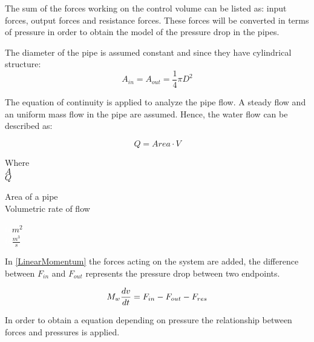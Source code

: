 The sum of the forces working on the control volume can be listed as: input forces, output forces and resistance forces.  
These forces will be converted in terms of pressure in order to obtain the model of the pressure drop in the pipes. 

The diameter of the pipe is assumed constant and since they have cylindrical structure:
\begin{equation}
  A_{in} = A_{out} = \frac{1}{4}\pi D^{2}
\end{equation}

The equation of continuity is applied to analyze the pipe flow. A steady flow and an uniform 
mass flow in the pipe are assumed. Hence, the water flow can be described as: 

\begin{equation}
  Q=Area \cdot V
	\label{EquationOfContinuity}
\end{equation}

 \begin{minipage}[t]{0.20\textwidth}
Where\\
\hspace*{8mm} $A$ \\
\hspace*{8mm} $Q$ 
\end{minipage}
\begin{minipage}[t]{0.68\textwidth}
\vspace*{2mm}
Area of a pipe\\
Volumetric rate of flow

\end{minipage}
\begin{minipage}[t]{0.10\textwidth}
\vspace*{2mm}
\textcolor{White}{te}$\unit{m^{2}}$\\
\textcolor{White}{te}$\unit{\frac{m^{3}}{s}}$
\end{minipage}

 In \eqref{LinearMomentum} the forces acting on the system are added, the difference between $F_{in}$ and $F_{out}$ represents the pressure drop 
 between two endpoints.

\begin{equation}
  M_w \frac{dv}{dt} = F_{in} - F_{out} - F_{res} \\
  \label{LinearMomentum}
\end{equation}

In order to obtain a equation depending on pressure the relationship between forces and pressures is applied.


